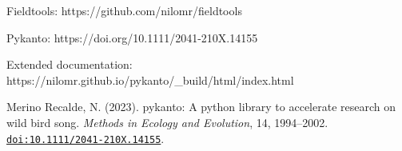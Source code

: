 Fieldtools: 
https://github.com/nilomr/fieldtools

Pykanto:
https://doi.org/10.1111/2041-210X.14155

Extended documentation:
https://nilomr.github.io/pykanto/_build/html/index.html

Merino Recalde, N. (2023). pykanto: A python library to accelerate research on wild bird song. \textit{Methods in Ecology and Evolution}, 14, 1994--2002. \href{https://doi.org/10.1111/2041-210X.14155}{\nolinkurl{doi:10.1111/2041-210X.14155}}.